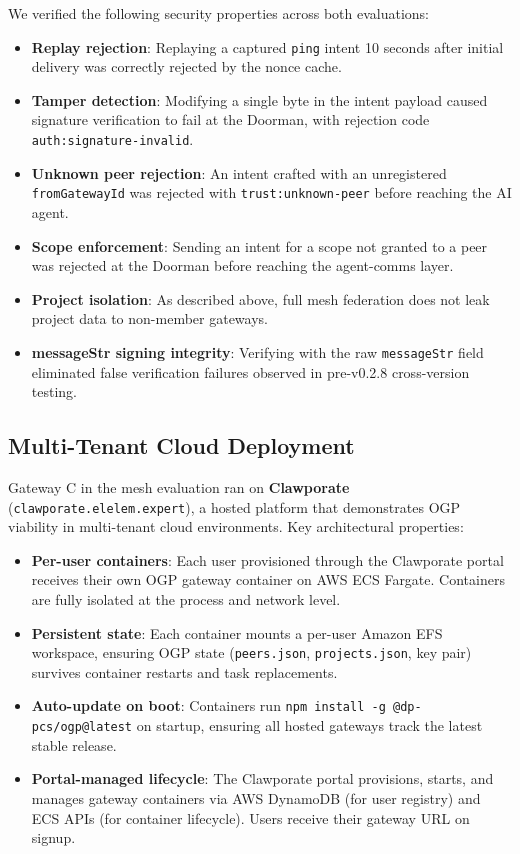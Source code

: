 \documentclass[conference]{IEEEtran}
\begin{document}
We verified the following security properties across both evaluations:

\begin{itemize}
  \item \textbf{Replay rejection}: Replaying a captured \texttt{ping} intent 10 seconds after initial delivery was correctly rejected by the nonce cache.
  \item \textbf{Tamper detection}: Modifying a single byte in the intent payload caused signature verification to fail at the Doorman, with rejection code \texttt{auth:signature-invalid}.
  \item \textbf{Unknown peer rejection}: An intent crafted with an unregistered \texttt{fromGatewayId} was rejected with \texttt{trust:unknown-peer} before reaching the AI agent.
  \item \textbf{Scope enforcement}: Sending an intent for a scope not granted to a peer was rejected at the Doorman before reaching the agent-comms layer.
  \item \textbf{Project isolation}: As described above, full mesh federation does not leak project data to non-member gateways.
  \item \textbf{messageStr signing integrity}: Verifying with the raw \texttt{messageStr} field eliminated false verification failures observed in pre-v0.2.8 cross-version testing.
\end{itemize}

\subsection{Multi-Tenant Cloud Deployment}
\label{sec:multitenant}

Gateway C in the mesh evaluation ran on \textbf{Clawporate} (\texttt{clawporate.elelem.expert}), a hosted platform that demonstrates OGP viability in multi-tenant cloud environments. Key architectural properties:

\begin{itemize}
  \item \textbf{Per-user containers}: Each user provisioned through the Clawporate portal receives their own OGP gateway container on AWS ECS Fargate. Containers are fully isolated at the process and network level.
  \item \textbf{Persistent state}: Each container mounts a per-user Amazon EFS workspace, ensuring OGP state (\texttt{peers.json}, \texttt{projects.json}, key pair) survives container restarts and task replacements.
  \item \textbf{Auto-update on boot}: Containers run \texttt{npm install -g @dp-pcs/ogp@latest} on startup, ensuring all hosted gateways track the latest stable release.
  \item \textbf{Portal-managed lifecycle}: The Clawporate portal provisions, starts, and manages gateway containers via AWS DynamoDB (for user registry) and ECS APIs (for container lifecycle). Users receive their gateway URL on signup.
\end{itemize}
\end{document}
